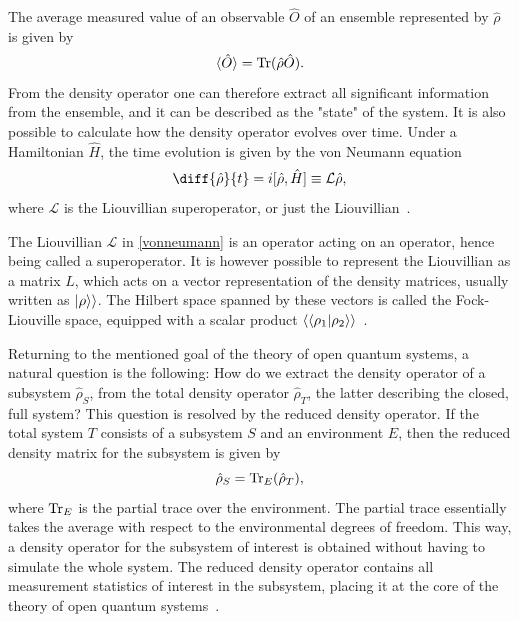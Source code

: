 \documentclass[../main.tex]{subfiles}
\begin{document}
The average measured value of an observable $\hat O$ of an ensemble represented by $\hat\rho$ is given by
\begin{equation}\label{eq:expec}
    \braket{\hat O} = \operatorname{Tr}({\hat\rho \hat O}).
\end{equation}
From the density operator one can therefore extract all significant information from the ensemble, and it can be described as the "state" of the system. It is also possible to calculate how the density operator evolves over time. Under a Hamiltonian $\hat H$, the time evolution is given by the von Neumann equation
\begin{equation}\label{vonneumann}
    \diff{\hat\rho}{t} = i[\hat \rho, \hat H] \equiv \mathcal{L}\hat\rho,
\end{equation}
where $\mathcal{L}$ is the Liouvillian superoperator, or just the Liouvillian~\cite{bookopen}. 

The Liouvillian $\mathcal{L}$ in \cref{vonneumann} is an operator acting on an operator, hence being called a superoperator. It is however possible to represent the Liouvillian as a matrix $L$, which acts on a vector representation of the density matrices, usually written as $\ket{\rho}\rangle$. The Hilbert space spanned by these vectors is called the Fock-Liouville space, equipped with a scalar product $\langle\braket{\rho_1|\rho_2}\rangle$~\cite{lindblad}. 

Returning to the mentioned goal of the theory of open quantum systems, a natural question is the following: How do we extract the density operator of a subsystem $\hat\rho_S$, from the total density operator $\hat\rho_T$, the latter describing the closed, full system? This question is resolved by the reduced density operator. If the total system $T$ consists of a subsystem $S$ and an environment $E$, then the reduced density matrix for the subsystem is given by
\begin{equation}
    \hat\rho_S = \operatorname{Tr}_E({\hat\rho_T}),
\end{equation}
where $\operatorname{Tr}_E$ is the partial trace over the environment. The partial trace essentially takes the average with respect to the environmental degrees of freedom. This way, a density operator for the subsystem of interest is obtained without having to simulate the whole system. The reduced density operator contains all measurement statistics of interest in the subsystem, placing it at the core of the theory of open quantum systems~\cite{bookopen}.
\end{document}
